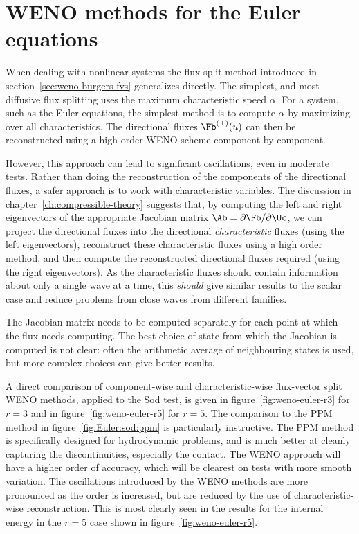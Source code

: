 
\section{WENO methods for the Euler equations}
\label{sec:weno-euler}

When dealing with nonlinear systems the flux split method introduced in
section~\ref{sec:weno-burgers-fvs} generalizes directly. The simplest, and most
diffusive flux splitting uses the maximum characteristic speed $\alpha$. For a
system, such as the Euler equations, the simplest method is to compute $\alpha$
by maximizing over all characteristics. The directional fluxes $\Fb^{(\pm)}(u)$
can then be reconstructed using a high order WENO scheme component by component.

However, this approach can lead to significant oscillations, even in moderate
tests. Rather than doing the reconstruction of the components of the directional
fluxes, a safer approach is to work with characteristic variables. The
discussion in chapter~\ref{ch:compressible-theory} suggests that, by computing
the left and right eigenvectors of the appropriate Jacobian matrix
$\Ab = \partial \Fb/\partial \Uc$, we can project the directional fluxes into
the directional \emph{characteristic} fluxes (using the left eigenvectors),
reconstruct these characteristic fluxes using a high order method, and then
compute the reconstructed directional fluxes required (using the right
eigenvectors). As the characteristic fluxes should contain information about
only a single wave at a time, this \emph{should} give similar results to the
scalar case and reduce problems from close waves from different families.

The Jacobian matrix needs to be computed separately for each point at which the
flux needs computing. The best choice of state from which the Jacobian is
computed is not clear: often the arithmetic average of neighbouring states is
used, but more complex choices can give better results.

A direct comparison of component-wise and characteristic-wise flux-vector split
WENO methods, applied to the Sod test, is given in
figure~\ref{fig:weno-euler-r3} for $r=3$ and in figure~\ref{fig:weno-euler-r5}
for $r=5$. The comparison to the PPM method in figure~\ref{fig:Euler:sod:ppm} is
particularly instructive. The PPM method is specifically designed for
hydrodynamic problems, and is much better at cleanly capturing the
discontinuities, especially the contact. The WENO approach will have a higher
order of accuracy, which will be clearest on tests with more smooth variation.
The oscillations introduced by the WENO methods are more pronounced as the
order is increased, but are reduced by the use of characteristic-wise
reconstruction. This is most clearly seen in the results for the internal energy
in the $r=5$ case shown in figure~\ref{fig:weno-euler-r5}.

